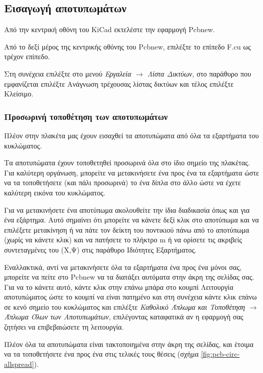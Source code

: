 \documentclass[a4paper]{article}
\begin{document}

\subsection{Εισαγωγή αποτυπωμάτων}
Από την κεντρική οθόνη του \textenglish{KiCad} εκτελέστε την εφαρμογή Pcbnew. 

Από το δεξί μέρος της κεντρικής οθόνης του Pcbnew, επιλέξτε το επίπεδο F.cu ως τρέχον επίπεδο.

Στη συνέχεια επιλέξτε στο μενού \textit{Εργαλεία $\rightarrow$ Λίστα Δικτύων}, στο παράθυρο που εμφανίζεται επιλέξτε Ανάγνωση τρέχουσας λίστας δικτύων και τέλος επιλέξτε Κλείσιμο.

\subsubsection{Προσωρινή τοποθέτηση των αποτυπωμάτων}
Πλέον στην πλακέτα μας έχουν εισαχθεί τα αποτυπώματα από όλα τα εξαρτήματα του κυκλώματος. 

Τα αποτυπώματα έχουν τοποθετηθεί προσωρινά όλα στο ίδιο σημείο της πλακέτας. Για καλύτερη οργάνωση, μπορείτε να μετακινήσετε ένα προς ένα τα εξαρτήματα ώστε να τα τοποθετήσετε (και πάλι προσωρινά) το ένα δίπλα στο άλλο ώστε να έχετε καλύτερη εικόνα του κυκλώματος. 

Για να μετακινήσετε ένα αποτύπωμα ακολουθείτε την ίδια διαδικασία όπως και για ένα εξάρτημα. Αυτό σημαίνει ότι μπορείτε να κάνετε δεξί κλικ στο αποτύπωμα και να επιλέξετε μετακίνηση ή να πάτε τον δείκτη του ποντικιού πάνω από το αποτύπωμα (χωρίς να κάνετε κλικ) και να πατήσετε το πλήκτρο m ή να ορίσετε τις ακριβείς συντεταγμένες του (Χ,Ψ) στις παράθυρο Ιδιότητες Εξαρτήματος. 

Εναλλακτικά, αντί να μετακινήσετε όλα τα εξαρτήματα ένα προς ένα μόνοι σας, μπορείτε να πείτε στο Pcbnew να τα διατάξει αυτόματα στην άκρη της σελίδας σας. Για να το κάνετε αυτό, κάντε κλικ στην επάνω μπάρα στο κουμπί Λειτουργία αποτυπώματος ώστε το κουμπί να είναι πατημένο και στη συνέχεια κάντε κλικ επάνω σε κενό σημείο του κυκλώματος και επιλέξτε \textit{Καθολικό Άπλωμα και Τοποθέτηση $\rightarrow$ Άπλωμα Όλων των Αποτυπωμάτων}, επιλέγοντας καταφατικά αν η εφαρμογή σας ζητήσει να επιβεβαιώσετε τη λειτουργία. 

Πλέον όλα τα αποτυπώματα είναι τακτοποιημένα στην άκρη της σελίδας, και έτοιμα να τα τοποθετήσετε ένα προς ένα στις τελικές τους θέσεις (σχήμα \ref{fig:pcb-circ-allspread}).
\end{document}

